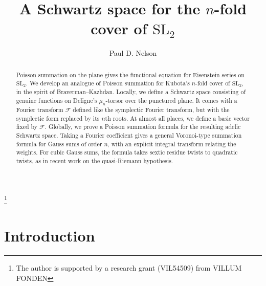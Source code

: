 \documentclass[reqno]{amsart}
\theoremstyle{plain}
\theoremstyle{definition}
\theoremstyle{itplain}
\numberwithin{equation}{section}
\numberwithin{theorem}{section}
\begin{document}
\author{Paul D. Nelson}


\address{Aarhus University, Ny Munkegade 118,
  DK-8000 Aarhus, Denmark}

\title{A Schwartz space for the $n$-fold cover of $\mathrm{SL}_2$}



\thanks{The author is supported by a research grant (VIL54509) from VILLUM FONDEN}

\begin{abstract}
  Poisson summation on the plane gives the functional equation for Eisenstein series on $\mathrm{SL}_2$.  We develop an analogue of Poisson summation for Kubota's $n$-fold cover of $\mathrm{SL}_2$, in the spirit of Braverman--Kazhdan.  Locally, we define a Schwartz space consisting of genuine functions on Deligne's $\mu_n$-torsor over the punctured plane.  It comes with a Fourier transform $\mathcal{F}$ defined like the symplectic Fourier transform, but with the symplectic form replaced by its $n$th roots.  At almost all places, we define a basic vector fixed by $\mathcal{F}$.  Globally, we prove a Poisson summation formula for the resulting adelic Schwartz space.  Taking a Fourier coefficient gives a general Voronoi-type summation formula for Gauss sums of order $n$, with an explicit integral transform relating the weights.  For cubic Gauss sums, the formula takes sextic residue twists to quadratic twists, as in recent work on the quasi-Riemann hypothesis.
\end{abstract}

\maketitle

\setcounter{tocdepth}{1} \tableofcontents

\section{Introduction}\label{sec:introduction}
\end{document}
